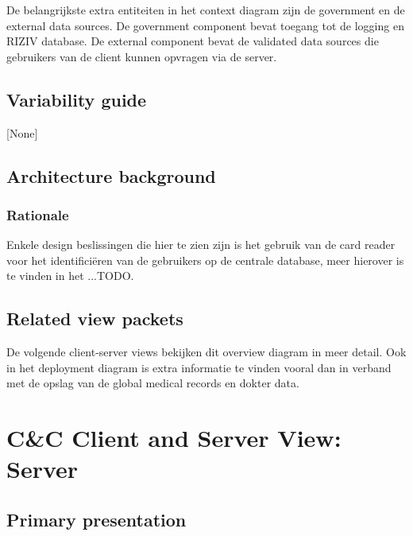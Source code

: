 \documentclass[a4paper,10pt]{article}
\begin{document}
De belangrijkste extra entiteiten in het context diagram zijn de government en de external data sources.  De government component bevat toegang tot de logging en RIZIV database.  De external component bevat de validated data sources die gebruikers van de client kunnen opvragen via de server.

\subsection{Variability guide}
[None]

\subsection{Architecture background}

\subsubsection{Rationale}
Enkele design beslissingen die hier te zien zijn is het gebruik van de card reader voor het identifici\"{e}ren van de gebruikers 
op de centrale database, meer hierover is te vinden in het ...TODO.


\subsection{Related view packets}
De volgende client-server views bekijken dit overview diagram in meer detail.  Ook in het deployment diagram is extra informatie te vinden vooral dan in verband met de opslag van de global medical records en dokter data.



\clearpage
\section{C\&C Client and Server View: Server}
\label{Client and Server View: Server}
\subsection{Primary presentation}
\end{document}
